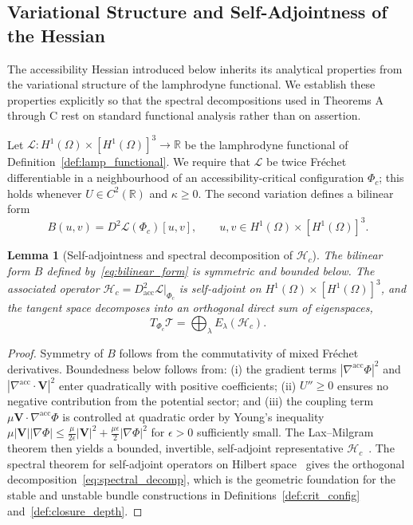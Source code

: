 \documentclass[12pt,a4paper]{article}
\theoremstyle{plain}
\newtheorem{lemma}[theorem]{Lemma}
\theoremstyle{definition}
\theoremstyle{remark}
\newcommand{\Phic}{\Phi_c}
\newcommand{\Tacc}{\mathcal{T}}
\newcommand{\Hacc}{\mathcal{H}}
\newcommand{\Lacc}{\mathcal{L}}
\newcommand{\nabacc}{\nabla^{\!\mathrm{acc}}}
\begin{document}
\subsection{Variational Structure and Self-Adjointness of the Hessian}
\label{subsec:selfadjoint}

The accessibility Hessian introduced below inherits its analytical properties from
the variational structure of the lamphrodyne functional. We establish these
properties explicitly so that the spectral decompositions used in Theorems A
through C rest on standard functional analysis rather than on assertion.

Let $\Lacc : H^1(\Omega)\times[H^1(\Omega)]^3 \to \mathbb{R}$ be the lamphrodyne
functional of Definition~\ref{def:lamp_functional}. We require that $\Lacc$ be
twice Fr\'{e}chet differentiable in a neighbourhood of an accessibility-critical
configuration $\Phic$; this holds whenever $U\in C^2(\mathbb{R})$ and $\kappa \geq 0$.
The second variation defines a bilinear form
\begin{equation}
  B(u,v) = D^2\Lacc(\Phic)[u,v],
  \qquad u,v\in H^1(\Omega)\times[H^1(\Omega)]^3.
  \label{eq:bilinear_form}
\end{equation}

\begin{lemma}[Self-adjointness and spectral decomposition of $\Hacc_c$]
\label{lem:selfadjoint}
The bilinear form $B$ defined by~\eqref{eq:bilinear_form} is symmetric and bounded
below. The associated operator $\Hacc_c = D^2_{\mathrm{acc}}\Lacc|_{\Phic}$ is
self-adjoint on $H^1(\Omega)\times[H^1(\Omega)]^3$, and the tangent space decomposes
into an orthogonal direct sum of eigenspaces,
\begin{equation}
  T_{\Phic}\Tacc = \bigoplus_\lambda E_\lambda(\Hacc_c).
  \label{eq:spectral_decomp}
\end{equation}
\end{lemma}

\begin{proof}
Symmetry of $B$ follows from the commutativity of mixed Fr\'{e}chet derivatives.
Boundedness below follows from: (i) the gradient terms $|\nabacc\Phi|^2$ and
$|\nabacc\cdot\mathbf{V}|^2$ enter quadratically with positive coefficients; (ii)
$U''\geq 0$ ensures no negative contribution from the potential sector; and (iii)
the coupling term $\mu\mathbf{V}\cdot\nabacc\Phi$ is controlled at quadratic order
by Young's inequality $\mu|\mathbf{V}||\nabla\Phi|\leq \frac{\mu}{2\epsilon}|\mathbf{V}|^2
+ \frac{\mu\epsilon}{2}|\nabla\Phi|^2$ for $\epsilon > 0$ sufficiently small.
The Lax--Milgram theorem then yields a bounded, invertible, self-adjoint representative
$\Hacc_c$~\cite{Arnold1989}. The spectral theorem for self-adjoint operators on
Hilbert space~\cite{Hirsch1974} gives the orthogonal decomposition~\eqref{eq:spectral_decomp},
which is the geometric foundation for the stable and unstable bundle constructions
in Definitions~\ref{def:crit_config} and~\ref{def:closure_depth}.
\end{proof}
\end{document}
